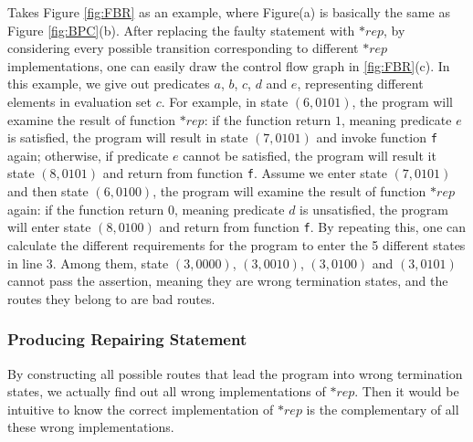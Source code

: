 \documentclass[10pt,journal,final,]{article}
\theoremstyle{definition}
\begin{document}
Takes Figure \ref{fig:FBR} as an example, where Figure(a) is basically the same as Figure \ref{fig:BPC}(b).
After replacing the faulty statement with $*rep$, by considering every possible transition corresponding to different $*rep$ implementations,
one can easily draw the control flow graph in \ref{fig:FBR}(c). In this example, we give out predicates $a$, $b$, $c$, $d$ and $e$, representing different elements in evaluation set $c$.
For example, in state $(6,0101)$, the program will examine the result of function $*rep$: if the function return $1$, meaning predicate $e$ is satisfied, the program will result in state $(7,0101)$ and invoke function \lstinline|f| again; otherwise, if predicate $e$ cannot be satisfied, the program will result it state $(8,0101)$ and return from function \lstinline|f|.
Assume we enter state $(7,0101)$ and then state $(6,0100)$, the program will examine the result of function $*rep$ again: if the function return $0$, meaning predicate $d$ is unsatisfied, the program will enter state $(8,0100)$ and return from function \lstinline|f|.
By repeating this, one can calculate the different requirements for the program to enter the 5 different states in line $3$. Among them, state $(3,0000)$, $(3,0010)$, $(3,0100)$ and $(3,0101)$ cannot pass the assertion, meaning they are wrong termination states, and the routes they belong to are bad routes.

\subsubsection{Producing Repairing Statement}
\label{section:ProducingRepairingStatement}
By constructing all possible routes that lead the program into wrong termination states, we actually find out all wrong implementations of $*rep$.
Then it would be intuitive to know the correct implementation of $*rep$ is the complementary of all these wrong implementations.
\end{document}
